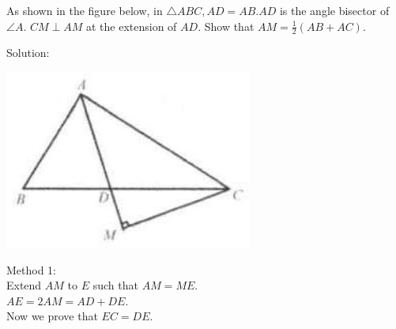\documentclass{article}
\begin{document}
As shown in the figure below, in \(\triangle A B C, A D=A B . A D\) is the angle bisector of \(\angle A\). \(C M \perp A M\) at the extension of \(A D\). Show that \(A M=\frac{1}{2}(A B+A C)\).

Solution:
\begin{center}
\includegraphics[width=\textwidth]{images/057(3).jpg}
\end{center}

Method 1:\\
Extend \(A M\) to \(E\) such that \(A M=M E\).\\
\(A E=2 A M=A D+D E\).\\
Now we prove that \(E C=D E\).
\end{document}
